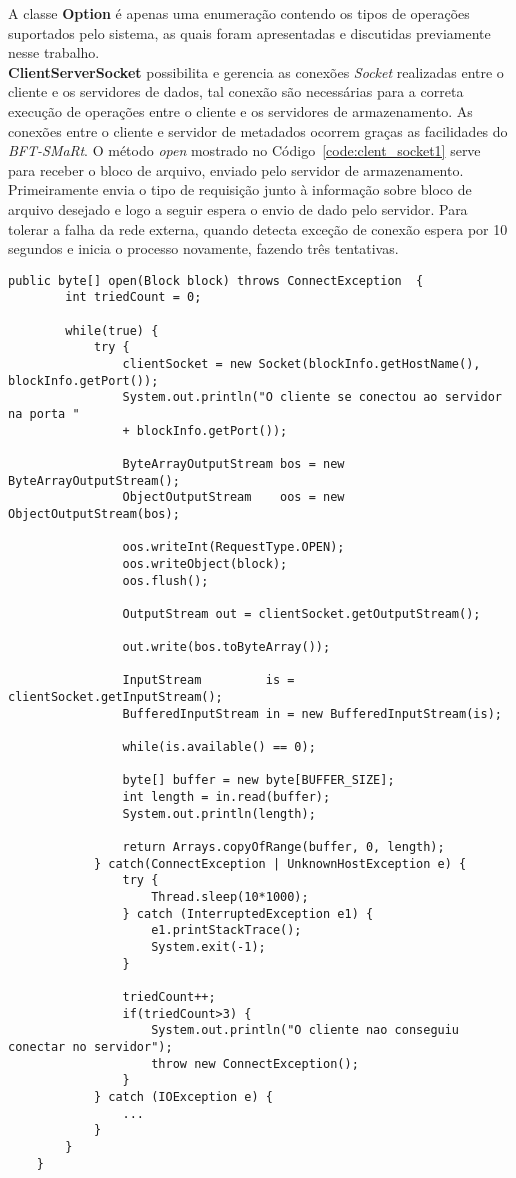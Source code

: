 A classe \textbf{Option} é apenas uma enumeração contendo os tipos de operações suportados pelo sistema, as quais foram apresentadas e discutidas previamente nesse trabalho.
\\

\textbf{ClientServerSocket} possibilita e gerencia as conexões \textit{Socket} realizadas entre o cliente e os servidores de dados, tal conexão são necessárias para a correta execução de operações entre o cliente e os servidores de armazenamento. As conexões entre o cliente e servidor de metadados ocorrem graças as facilidades do \textit{BFT-SMaRt}.
O método \textit{open} mostrado no Código~\ref{code:clent_socket1} serve para receber o bloco de arquivo, enviado pelo servidor de armazenamento.
Primeiramente envia o tipo de requisição junto à informação sobre bloco de arquivo desejado e logo a seguir espera o envio de dado pelo servidor.
Para tolerar a falha da rede externa, quando detecta exceção de conexão espera por 10 segundos e inicia o processo novamente, fazendo três tentativas.

\begin{lstlisting}[basicstyle=\ttfamily\footnotesize, frame=single, caption=Exemplo de método da classe ClientServerSocket, label=code:clent_socket1]	
	public byte[] open(Block block) throws ConnectException  {
		int triedCount = 0;
		
		while(true) {
			try {
				clientSocket = new Socket(blockInfo.getHostName(), blockInfo.getPort());
				System.out.println("O cliente se conectou ao servidor na porta " 
				+ blockInfo.getPort());
				
				ByteArrayOutputStream bos = new ByteArrayOutputStream();
				ObjectOutputStream    oos = new ObjectOutputStream(bos);
				
				oos.writeInt(RequestType.OPEN);
				oos.writeObject(block);
				oos.flush();
				
				OutputStream out = clientSocket.getOutputStream();
				
				out.write(bos.toByteArray());
			
				InputStream         is = clientSocket.getInputStream();
				BufferedInputStream in = new BufferedInputStream(is);
				
				while(is.available() == 0);
				
				byte[] buffer = new byte[BUFFER_SIZE];
				int length = in.read(buffer);
				System.out.println(length);
			
				return Arrays.copyOfRange(buffer, 0, length);
			} catch(ConnectException | UnknownHostException e) {
				try {
					Thread.sleep(10*1000);
				} catch (InterruptedException e1) {
					e1.printStackTrace();
					System.exit(-1);
				}
				
				triedCount++;
				if(triedCount>3) {
					System.out.println("O cliente nao conseguiu conectar no servidor");
					throw new ConnectException();
				}
			} catch (IOException e) {
				...
			}
		}
	}
\end{lstlisting}

